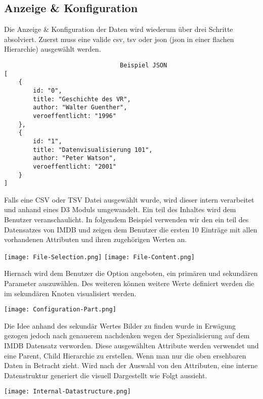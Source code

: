 \subsection{Anzeige \& Konfiguration}
Die Anzeige \& Konfiguration der Daten wird wiederum über drei Schritte absolviert. Zuerst muss eine valide csv, tsv oder json (json in einer
flachen Hierarchie) ausgewählt werden.
\begin{lstlisting}
                                Beispiel JSON
[
    {
        id: "0",
        title: "Geschichte des VR",
        author: "Walter Guenther",
        veroeffentlicht: "1996"
    },
    {
        id: "1",
        title: "Datenvisualisierung 101",
        author: "Peter Watson",
        veroeffentlicht: "2001"
    }
]
\end{lstlisting}
\newpage \noindent
Falls eine CSV oder TSV Datei ausgewählt wurde, wird dieser intern verarbeitet und anhand eines D3 Moduls umgewandelt. Ein teil des Inhaltes wird
dem Benutzer veranschaulicht. In folgendem Beispiel verwenden wir den ein teil des Datensatzes von IMDB und zeigen dem Benutzer die ersten 10 Einträge mit allen
vorhandenen Attributen und ihren zugehörigen Werten an.
\begin{center}
    \texttt{[image: File-Selection.png]}
    \texttt{[image: File-Content.png]} \\
\end{center}
Hiernach wird dem Benutzer die Option angeboten, ein primären und sekundären Parameter auszuwählen. Des weiteren können weitere Werte definiert
werden die im sekundären Knoten visualisiert werden.
\begin{center}
    \texttt{[image: Configuration-Part.png]} \\
\end{center}
Die Idee anhand des sekundär Wertes Bilder zu finden wurde in Erwägung gezogen jedoch nach genauerem nachdenken wegen der Spezialisierung
auf dem IMDB Datensatz verworden. Diese ausgewählten Attribute werden verwendet und eine Parent, Child Hierarchie zu erstellen. 
Wenn man nur die oben ersehbaren Daten in Betracht zieht. Wird nach der Auswahl von den Attributen, eine interne Datenstruktur generiert
die visuell Dargestellt wie Folgt aussieht.
\begin{center}
    \texttt{[image: Internal-Datastructure.png]}\label{setup_data} \\
\end{center}

